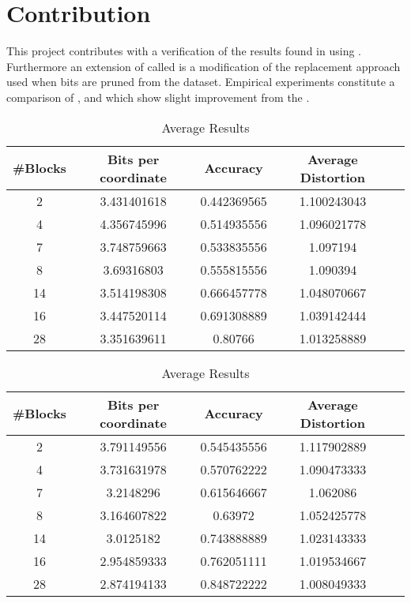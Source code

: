 \section{Contribution}
\label{contribution}
This project contributes with a verification of the results found in \cite{wagner17} using \qs{}. Furthermore an extension of \qs{} called \qsr{} is a modification of the replacement approach used when bits are pruned from the dataset. Empirical experiments constitute a comparison of \qs{}, \grid{} and \qsr{} which show slight improvement from the \qs{}.

\begin{table}[h!]
	\centering
	\caption{Average Results \mnist{} \qs{}}
	\label{table:avg_mnist_qs}
	\begin{tabular}{ccccc}
		\hline
		\#Blocks & Bits per coordinate & Accuracy  & Average Distortion \\ \hline
		2 & 3.431401618 & 0.442369565 & 1.100243043  \\
		4 & 4.356745996 & 0.514935556 & 1.096021778  \\
		7 & 3.748759663 & 0.533835556 & 1.097194 \\
		8 & 3.69316803 & 0.555815556 & 1.090394 \\
		14 & 3.514198308 & 0.666457778 & 1.048070667 \\
		16 & 3.447520114 & 0.691308889 & 1.039142444 \\
		28 & 3.351639611 & 0.80766 & 1.013258889 \\
		\hline
	\end{tabular}
\end{table}

\begin{table}[h!]
	\centering
	\caption{Average Results \mnist{} \qsr{}}
	\label{table:avg_mnist_qsr}
	\begin{tabular}{ccccc}
		\hline
		\#Blocks & Bits per coordinate & Accuracy  & Average Distortion \\ \hline
		2 & 3.791149556 & 0.545435556 & 1.117902889  \\
		4 & 3.731631978 & 0.570762222 & 1.090473333  \\
		7 & 3.2148296 & 0.615646667 & 1.062086 \\
		8 & 3.164607822 & 0.63972 & 1.052425778 \\
		14 & 3.0125182 & 0.743888889 & 1.023143333 \\
		16 & 2.954859333 & 0.762051111 & 1.019534667 \\
		28 & 2.874194133 & 0.848722222 & 1.008049333 \\
		\hline
	\end{tabular}
\end{table}

